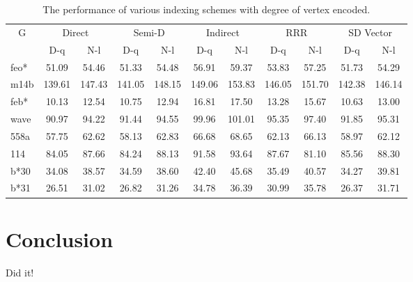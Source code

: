 \documentclass[12pt,glossary]{dalthesis}
\begin{document}
\begin{table}[ht]
\caption{The performance of various indexing schemes with degree of vertex encoded.}
\label{my-label}
\begin{tabular}{|l||c|c||c|c||c|c||c|c||c|c|}
\hline
\multicolumn{1}{|c||}{\multirow{2}{*}{G}} & \multicolumn{2}{c||}{Direct} & \multicolumn{2}{c||}{Semi-D} & \multicolumn{2}{c||}{Indirect} & \multicolumn{2}{c||}{RRR} & \multicolumn{2}{c|}{SD Vector} \\
\cline{2-11}
\multicolumn{1}{|c||}{}                       & D-q          & N-l         & D-q          & N-l         & D-q           & N-l          & D-q        & N-l        & D-q           & N-l           \\ \hline
feo*                                    & 51.09        & 54.46       & 51.33        & 54.48       & 56.91         & 59.37        & 53.83      & 57.25      & 51.73         & 54.29         \\
m14b                                       & 139.61       & 147.43      & 141.05       & 148.15      & 149.06        & 153.83       & 146.05     & 151.70     & 142.38        & 146.14        \\
feb*                                     & 10.13        & 12.54       & 10.75        & 12.94       & 16.81         & 17.50        & 13.28      & 15.67      & 10.63         & 13.00         \\
wave                                       & 90.97        & 94.22       & 91.44        & 94.55       & 99.96         & 101.01       & 95.35      & 97.40      & 91.85         & 95.31         \\
558a                                       & 57.75        & 62.62       & 58.13        & 62.83       & 66.68         & 68.65        & 62.13      & 66.13      & 58.97         & 62.12         \\
114                                        & 84.05        & 87.66       & 84.24        & 88.13       & 91.58         & 93.64        & 87.67      & 81.10      & 85.56         & 88.30         \\
b*30                                   & 34.08        & 38.57       & 34.59        & 38.60       & 42.40         & 45.68        & 35.49      & 40.57      & 34.27         & 39.81         \\
b*31                                   & 26.51        & 31.02       & 26.82        & 31.26       & 34.78         & 36.39        & 30.99      & 35.78      & 26.37         & 31.71        \\ 	\hline
\end{tabular}
\end{table}



\chapter{Conclusion}

Did it!



\end{document}
